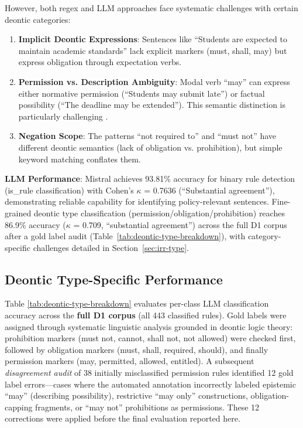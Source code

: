 However, both regex and LLM approaches face systematic challenges with certain deontic categories:

\begin{enumerate}
    \item \textbf{Implicit Deontic Expressions}: Sentences like ``Students are expected to maintain academic standards'' lack explicit markers (must, shall, may) but express obligation through expectation verbs.
    
    \item \textbf{Permission vs. Description Ambiguity}: Modal verb ``may'' can express either normative permission (``Students may submit late'') or factual possibility (``The deadline may be extended''). This semantic distinction is particularly challenging \citep{kratzer2012modals}.
    
    \item \textbf{Negation Scope}: The patterns ``not required to'' and ``must not'' have different deontic semantics (lack of obligation vs. prohibition), but simple keyword matching conflates them.
\end{enumerate}

\textbf{LLM Performance}: Mistral achieves 93.81\% accuracy for binary rule detection (is\_rule classification) with Cohen's $\kappa$ = 0.7636 (``Substantial agreement''), demonstrating reliable capability for identifying policy-relevant sentences. Fine-grained deontic type classification (permission/obligation/prohibition) reaches 86.9\% accuracy ($\kappa$ = 0.709, ``substantial agreement'') across the full D1 corpus after a gold label audit (Table~\ref{tab:deontic-type-breakdown}), with category-specific challenges detailed in Section~\ref{sec:irr-type}.

\subsection{Deontic Type-Specific Performance}

Table \ref{tab:deontic-type-breakdown} evaluates per-class LLM classification accuracy across the \textbf{full D1 corpus} (all 443 classified rules). Gold labels were assigned through systematic linguistic analysis grounded in deontic logic theory: prohibition markers (must not, cannot, shall not, not allowed) were checked first, followed by obligation markers (must, shall, required, should), and finally permission markers (may, permitted, allowed, entitled). A subsequent \textit{disagreement audit} of 38 initially misclassified permission rules identified 12 gold label errors---cases where the automated annotation incorrectly labeled epistemic ``may'' (describing possibility), restrictive ``may only'' constructions, obligation-capping fragments, or ``may not'' prohibitions as permissions. These 12 corrections were applied before the final evaluation reported here.

